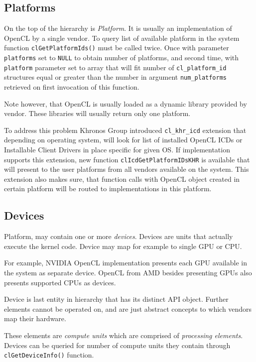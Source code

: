 \subsection{Platforms}

On the top of the hierarchy is \emph{Platform}. It is usually an implementation
of OpenCL by a single vendor. To query list of available platform in the system
function \texttt{clGetPlatformIds()} must be called twice. Once with parameter
\texttt{platforms} set to \texttt{NULL} to obtain number of platforms, and
second time, with \texttt{platform} parameter set to array that will fit
number of \texttt{cl\_platform\_id} structures equal or greater than the number
in argument \texttt{num\_platforms} retrieved on first invocation of this
function.

Note however, that OpenCL is usually loaded as a dynamic library provided by
vendor. These libraries will usually return only one platform.

To address this problem Khronos Group introduced \texttt{cl\_khr\_icd} extension
that depending on operating system, will look for list of installed OpenCL
ICDs or Installable Client Drivers in place specific for given OS. If
implementation supports this extension, new function \texttt{clIcdGetPlatformIDsKHR}
is available that will present to the user platforms from all vendors available
on the system. This extension also makes sure, that function calls with OpenCL
object created in certain platform will be routed to implementations in this
platform.

\subsection{Devices}

Platform, may contain one or more \emph{devices}. Devices are units that
actually execute the kernel code. Device may map for example to single GPU or
CPU.

For example, NVIDIA OpenCL implementation presents each GPU available in the
system as separate device. OpenCL from AMD besides presenting GPUs also presents
supported CPUs as devices.

Device is last entity in hierarchy that has its distinct API object. Further
elements cannot be operated on, and are just abstract concepts to which vendors
map their hardware.

These elements are \emph{compute units} which are comprised of \emph{processing
elements}. Devices can be queried for number of compute units they contain
through \texttt{clGetDeviceInfo()} function.


